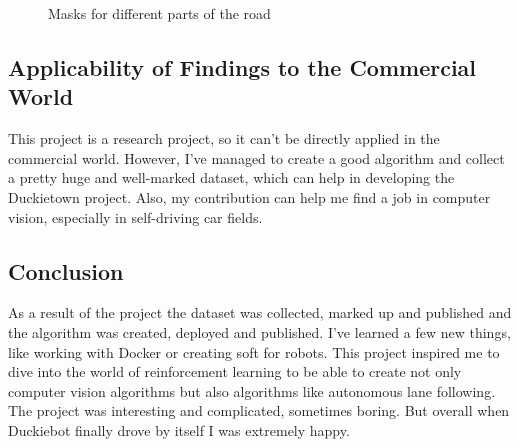 \begin{figure}[htbp]
    \caption{Masks for different parts of the road}\label{fig:masks}
\end{figure}
\subsection{Applicability of Findings to the Commercial World}
This project is a research project, so it can't be directly applied in the commercial world. However, I've managed to create a good algorithm and collect a
pretty huge and well-marked dataset, which can help in developing the Duckietown project. Also, my contribution can help me find a job in computer vision, 
especially in self-driving car fields. 
\subsection{Conclusion}
As a result of the project the dataset was collected, marked up and published and the algorithm was created, deployed and published.
I've learned a few new things, like working with Docker or creating soft for robots. This project inspired me to dive into the world of reinforcement learning
to be able to create not only computer vision algorithms but also algorithms like autonomous lane following. The project was interesting and complicated, 
sometimes boring. But overall when Duckiebot finally drove by itself I was extremely happy.
